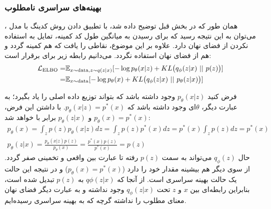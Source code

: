 \subsubsection{بهینه‌های سراسری نامطلوب}
همان ‌طور که در بخش قبل توضیح داده شد، با تطبیق دادن روش کدینگ   با مدل \vae{}، می‌توان به این نتیجه رسید که \decoder{} برای رسیدن به میانگین طول کد کمینه، تمایل به استفاده نکردن از فضای نهان دارد. علاوه بر این موضوع، نقاطی را یافت که هم  کمینه گردد و هم از فضای نهان استفاده نگردد. می‌دانیم رابطه زیر برای  برقرار است:
\begin{align}
	\mathcal{L}_{\text{ELBO}} = & \mathbb E_{x \sim \text{data}, z \sim q(z|x)} [- \log p_\theta(x|z) + KL\big(q_\phi(z|x) ~ || ~ p(z)\big)] \nonumber
	\\
	=                           & \mathbb E_{x \sim \text{data}} [-\log p_\theta(x) + KL\big(q_\phi(z|x) ~||~ p_\theta(z|x)\big)] \nonumber
\end{align}

فرض کنید $p_\theta(x|z)$ وجود داشته باشد که بتواند توزیع داده اصلی را یاد بگیرد؛ به عبارت دیگر، $\theta$ای وجود داشته باشد که $p_\theta(x|z) = p^*(x)$. با داشتن این فرض،
$p_\theta(x) = p^*(x)$
و
$p_\theta(z|x)$
برابر با \priordist{} خواهد شد:
\begin{gather}
	p_\theta(x) = \int_z p(z) p_\theta(x|z) dz = \int_z p(z) p^*(x) dz = p^*(x) \int_z p(z) dz = p^*(x)
	\\
	p_\theta(z|x) = \frac{p_\theta(x|z) p(z)}{p_\theta(x)} = \frac{p^*(x) p(z)}{p^*(x)} = p(z)
\end{gather}
حال $q_\phi(z)$ می‌تواند به سمت $p(z)$ رفته تا عبارت  بین \posterior{} واقعی و تخمینی صفر گردد. از سوی دیگر هم \likelihood{} بیشینه مقدار خود را دارد ($p_\theta(x) = p^*(x)$) و در نتیجه این حالت یک حالت بهینه سراسری است. از آنجا که $q\phi(z|x)$ به $p(z)$ تبدیل شده است، بنابراین رابطه‌ای بین $x$ و $z$ تحت $q_\phi(z|x)$ وجود نداشته و به عبارت دیگر فضای نهان معنای مطلوب را نداشته گرچه که به بهینه سراسری رسیده‌ایم.

